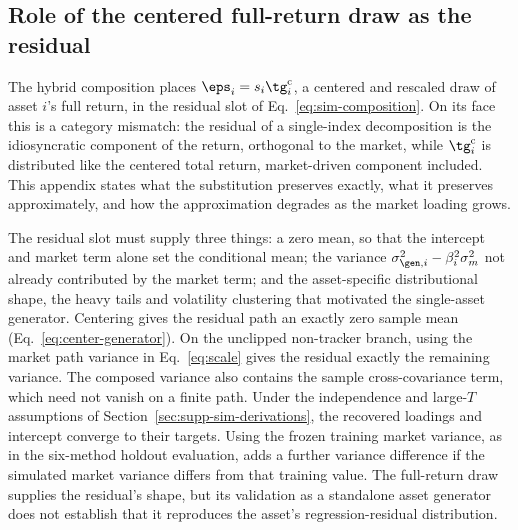 \subsection{Role of the centered full-return draw as the residual}
\label{sec:supp-residual-choice}

The hybrid composition places $\eps_i = s_i \tg_i^{\mathrm c}$, a
centered and rescaled draw of asset $i$'s full return, in the residual
slot of Eq.~\eqref{eq:sim-composition}. On its face this is a category
mismatch: the residual of a single-index decomposition is the
idiosyncratic component of the return, orthogonal to the market, while
$\tg_i^{\mathrm c}$ is distributed like the centered total return,
market-driven component included. This appendix states what the
substitution preserves exactly, what it preserves approximately, and
how the approximation degrades as the market loading grows.

The residual slot must supply three things: a zero mean, so that the
intercept and market term alone set the conditional mean; the variance
$\sigma_{\gen,i}^2 - \beta_i^2 \sigma_m^2$ not already contributed by
the market term; and the asset-specific distributional shape, the
heavy tails and volatility clustering that motivated the single-asset
generator. Centering gives the residual path an exactly zero sample
mean (Eq.~\eqref{eq:center-generator}). On the unclipped non-tracker
branch, using the market path variance in Eq.~\eqref{eq:scale} gives
the residual exactly the remaining variance. The composed variance
also contains the sample cross-covariance term, which need not vanish
on a finite path. Under the independence and large-$T$ assumptions of
Section~\ref{sec:supp-sim-derivations}, the recovered loadings and
intercept converge to their targets. Using the frozen training market
variance, as in the six-method holdout evaluation, adds a further
variance difference if the simulated market variance differs from that
training value. The full-return draw supplies the residual's shape,
but its validation as a standalone asset generator does not establish
that it reproduces the asset's regression-residual distribution.

